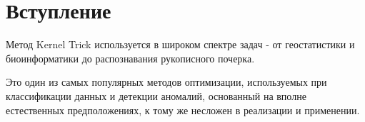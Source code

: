 \section{Вступление}
Метод Kernel Trick используется в широком спектре задач - от геостатистики и биоинформатики до распознавания рукописного почерка. 

Это один из самых популярных методов оптимизации, используемых при классификации данных и детекции аномалий, основанный на вполне естественных предположениях, к тому же несложен в реализации и применении.